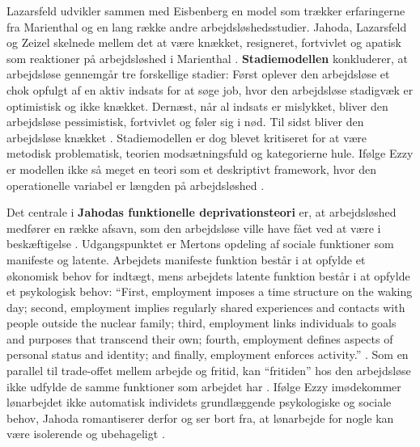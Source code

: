 Lazarsfeld udvikler sammen med Eisbenberg en model som trækker erfaringerne fra Marienthal og en lang række andre arbejdsløshedsstudier. Jahoda, Lazarsfeld og Zeizel skelnede mellem det at være knækket, resigneret, fortvivlet og apatisk som reaktioner på arbejdsløshed i Marienthal \parencite[56]{Jahoda1971}. \textbf{Stadiemodellen} konkluderer, at arbejdsløse gennemgår tre forskellige stadier: Først oplever den arbejdsløse et chok opfulgt af en aktiv indsats for at søge job, hvor den arbejdsløse stadigvæk er optimistisk og ikke knækket. Dernæst, når al indsats er mislykket, bliver den arbejdsløse pessimistisk, fortvivlet og føler sig i nød. Til sidst bliver den arbejdsløse knækket \parencite[378]{Eisenberg1938}. Stadiemodellen er dog blevet kritiseret for at være metodisk problematisk, teorien modsætningsfuld og kategorierne hule. Ifølge Ezzy er modellen ikke så meget en teori som et deskriptivt framework, hvor den operationelle variabel er længden på arbejdsløshed \parencite[44]{Ezzy1993}.

Det centrale i \textbf{Jahodas funktionelle deprivationsteori} er, at arbejdsløshed medfører en række afsavn, som den arbejdsløse ville have fået ved at være i beskæftigelse \parencite[44]{Ezzy1993}. Udgangspunktet er Mertons opdeling af sociale funktioner som manifeste og latente. Arbejdets manifeste funktion består i at opfylde et økonomisk behov for indtægt, mens arbejdets latente funktion består i at opfylde et psykologisk behov: “First, employment imposes a time structure on the waking day; second, employment implies regularly shared experiences and contacts with people outside the nuclear family; third, employment links individuals to goals and purposes that transcend their own; fourth, employment defines aspects of personal status and identity; and finally, employment enforces activity.” \parencite[188]{Jahod1981}. Som en parallel til trade-offet mellem arbejde og fritid, kan “fritiden” hos den arbejdsløse ikke udfylde de samme funktioner som arbejdet har \parencite[189]{Jahod1981}. Ifølge Ezzy imødekommer lønarbejdet ikke automatisk individets grundlæggende psykologiske og sociale behov, Jahoda romantiserer derfor og ser bort fra, at lønarbejde for nogle kan være isolerende og ubehageligt \parencite[45]{Ezzy1993}.

